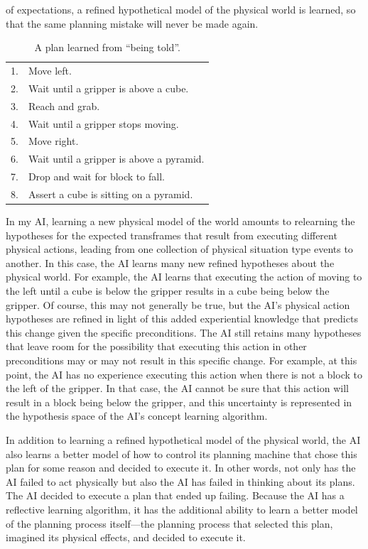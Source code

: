 of expectations, a refined hypothetical model of the physical world is
learned, so that the same planning mistake will never be made again.
\begin{table}
\centering
\begin{tabular}{|rl|}
\hline
 1. & Move left.\\
 2. & Wait until a gripper is above a cube.\\
 3. & Reach and grab.\\
 4. & Wait until a gripper stops moving.\\
 5. & Move right.\\
 6. & Wait until a gripper is above a pyramid.\\
 7. & Drop and wait for block to fall.\\
 8. & Assert a cube is sitting on a pyramid.\\
\hline
\end{tabular}
\caption[A plan learned from ``being told''.]{A plan learned from
  ``being told''.}
\label{table:a_plan_learned_from_being_told}
\end{table}
In my AI, learning a new physical model of the world amounts to
relearning the hypotheses for the expected transframes that result
from executing different physical actions, leading from one collection
of physical situation type events to another.  In this case, the AI
learns many new refined hypotheses about the physical world.  For
example, the AI learns that executing the action of moving to the left
until a cube is below the gripper results in a cube being below the
gripper.  Of course, this may not generally be true, but the AI's
physical action hypotheses are refined in light of this added
experiential knowledge that predicts this change given the specific
preconditions.  The AI still retains many hypotheses that leave room
for the possibility that executing this action in other preconditions
may or may not result in this specific change.  For example, at this
point, the AI has no experience executing this action when there is
not a block to the left of the gripper.  In that case, the AI cannot
be sure that this action will result in a block being below the
gripper, and this uncertainty is represented in the hypothesis space
of the AI's concept learning algorithm.

In addition to learning a refined hypothetical model of the physical
world, the AI also learns a better model of how to control its
planning machine that chose this plan for some reason and decided to
execute it.  In other words, not only has the AI failed to act
physically but also the AI has failed in thinking about its plans.
The AI decided to execute a plan that ended up failing.  Because the
AI has a reflective learning algorithm, it has the additional ability
to learn a better model of the planning process itself---the planning
process that selected this plan, imagined its physical effects, and
decided to execute it.

